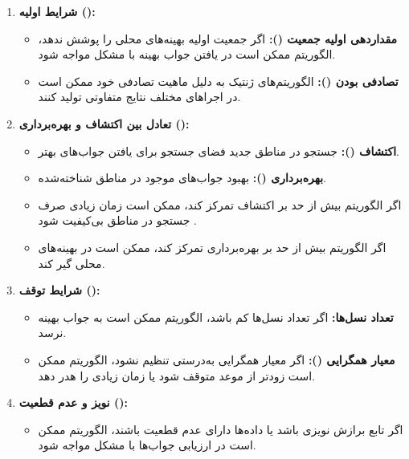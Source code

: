\documentclass[12pt]{exam}
\begin{document}
\begin{questions}
\begin{parts}
\begin{enumerate}
	 \item \textbf{شرایط اولیه ():}
	 
	 \begin{itemize}
	 	\item \textbf{مقداردهی اولیه جمعیت (): }
	 	اگر جمعیت اولیه بهینه‌های محلی را پوشش ندهد، الگوریتم ممکن است در یافتن جواب بهینه با مشکل مواجه شود.
	 	
	 	\item \textbf{تصادفی بودن (): }
	 	الگوریتم‌های ژنتیک به دلیل ماهیت تصادفی خود ممکن است در اجراهای مختلف نتایج متفاوتی تولید کنند.
	 	
	 \end{itemize}
	 
	 \item \textbf{تعادل بین اکتشاف و بهره‌برداری ():}
	 
	 
	\begin{itemize}
		\item \textbf{اکتشاف ():}
		جستجو در مناطق جدید فضای جستجو برای یافتن جواب‌های بهتر.
		
		\item \textbf{بهره‌برداری ():}
		بهبود جواب‌های موجود در مناطق شناخته‌شده.
		
		\item 	اگر الگوریتم بیش از حد بر اکتشاف تمرکز کند، ممکن است زمان زیادی صرف جستجو در مناطق بی‌کیفیت شود
		.
		\item اگر الگوریتم بیش از حد بر بهره‌برداری تمرکز کند، ممکن است در بهینه‌های محلی گیر کند.
		
	\end{itemize}
	
	
	\item \textbf{شرایط توقف ():}
	
	\begin{itemize}
		\item \textbf{تعداد نسل‌ها: }
		اگر تعداد نسل‌ها کم باشد، الگوریتم ممکن است به جواب بهینه نرسد.
		
		\item \textbf{معیار همگرایی (): }
		اگر معیار همگرایی به‌درستی تنظیم نشود، الگوریتم ممکن است زودتر از موعد متوقف شود یا زمان زیادی را هدر دهد.
	\end{itemize}
	
	\item \textbf{نویز و عدم قطعیت ():}
	
	\begin{itemize}
		\item اگر تابع برازش نویزی باشد یا داده‌ها دارای عدم قطعیت باشند، الگوریتم ممکن است در ارزیابی جواب‌ها با مشکل مواجه شود.
	\end{itemize}
	 \end{enumerate}
	 
	 \end{parts}

\end{questions}
\end{document}

